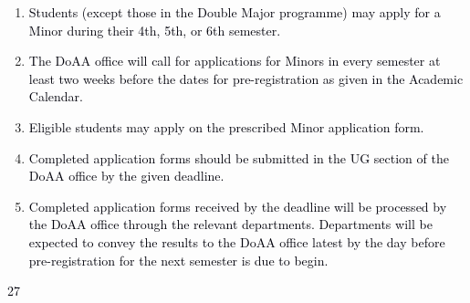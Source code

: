 \documentclass[12pt]{article}
\begin{document}
\vspace{\baselineskip}
\begin{enumerate}
	\item {\fontsize{9pt}{10.8pt}\selectfont \textcolor[HTML]{00000A}{Students (except those in the Double Major programme) may apply for a Minor during their 4th, 5th, or 6th semester.}\par}\par


\vspace{\baselineskip}
	\item {\fontsize{10pt}{12.0pt}\selectfont \textcolor[HTML]{00000A}{The DoAA office will call for applications for Minors in every semester at least two weeks before the dates for pre-registration as given in the Academic Calendar.}\par}\par


\vspace{\baselineskip}
	\item {\fontsize{10pt}{12.0pt}\selectfont \textcolor[HTML]{00000A}{Eligible students may apply on the prescribed Minor application form.}\par}\par


\vspace{\baselineskip}
	\item {\fontsize{10pt}{12.0pt}\selectfont \textcolor[HTML]{00000A}{Completed application forms should be submitted in the UG section of the DoAA office by the given deadline.}\par}\par


\vspace{\baselineskip}
	\item {\fontsize{10pt}{12.0pt}\selectfont \textcolor[HTML]{00000A}{Completed application forms received by the deadline will be processed by the DoAA office through the relevant departments. Departments will be expected to convey the results to the DoAA office latest by the day before pre-registration for the next semester is due to begin.}\par}
\end{enumerate}\par


\vspace{\baselineskip}
\begin{Center}
\textcolor[HTML]{00000A}{27}
\end{Center}\par
\end{document}
